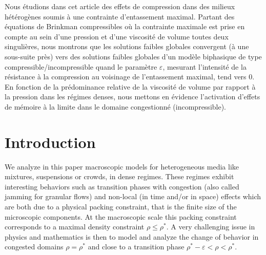 \documentclass[JEP,XML,SOM,Unicode,NoEqCountersInSection]{cedram}
\newcommand{\<}{\bigl\langle}
\renewcommand{\>}{\bigr\rangle}
\theoremstyle{definition}
\theoremstyle{remark}
\let\ep\varepsilon
\begin{document}



\begin{altabstract}
Nous étudions dans cet article des effets de compression dans des milieux hétérogènes soumis à une contrainte d'entassement maximal. Partant des équations de Brinkman compressibles où la contrainte maximale est prise en compte au sein d'une pression et d'une viscosité de volume toutes deux singulières, nous montrons que les solutions faibles globales convergent (à une sous-suite près) vers des solutions faibles globales d'un modèle biphasique de type compressible/incompressible quand le paramètre $\varepsilon$, mesurant l'intensité de la résistance à la compression au voisinage de l'entassement maximal, tend vers $0$. En fonction de la prédominance relative de la viscosité de volume par rapport à la pression dans les régimes denses, nous mettons en évidence l'activation d'effets de mémoire à la limite dans le domaine congestionné (incompressible).
\end{altabstract}
\maketitle
\vspace*{-\baselineskip}\enlargethispage{\baselineskip}
\tableofcontents


\section*{Introduction}
We analyze in this paper macroscopic models for heterogeneous media like mixtures, suspensions or crowds, in dense regimes. These regimes exhibit interesting behaviors such as transition phases with congestion (also called jamming for granular flows) and non-local (in time and/or in space) effects which are both due to a physical packing constraint, that is the finite size of the microscopic components. At the macroscopic scale this packing constraint corresponds to a maximal density constraint $ \rho \leq \rho^*$. A very challenging issue in physics and mathematics is then to model and analyze the change of behavior in congested domains $\rho = \rho^*$ and close to a transition phase $\rho^*-\ep<\rho<\rho^*$.\enlargethispage{.5\baselineskip}%
\end{document}
